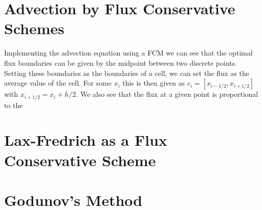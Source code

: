 \section{Advection by Flux Conservative Schemes}
Implementing the advection equation using a FCM we can see that the optimal flux boundaries can be given by the midpoint between two discrete points. Setting these boundaries as the boundaries of a cell, we can set the flux as the average value of the cell. For some $x_i$ this is then given as $c_i=[x_{i-1/2},x_{i+1/2}]$ with $x_{i+1/2} = x_i + h/2$. We also see that the flux at a given point is proportional to the
\section{Lax-Fredrich as a Flux Conservative Scheme}
\section{Godunov's Method} 